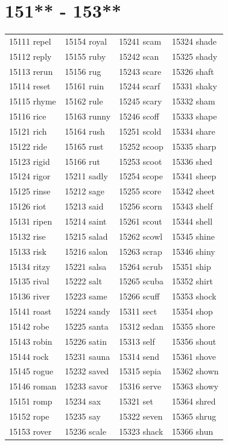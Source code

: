 \documentclass[10pt, oneside]{book}
\begin{document}
\begin{table}
	\centering
	\section*{151** - 153**}
	\begin{tabular}{l l l l}
15111 repel &15154 royal &15241 scam &15324 shade\\
15112 reply &15155 ruby &15242 scan &15325 shady\\
15113 rerun &15156 rug &15243 scare &15326 shaft\\
15114 reset &15161 ruin &15244 scarf &15331 shaky\\
15115 rhyme &15162 rule &15245 scary &15332 sham\\
15116 rice &15163 runny &15246 scoff &15333 shape\\
15121 rich &15164 rush &15251 scold &15334 share\\
15122 ride &15165 rust &15252 scoop &15335 sharp\\
15123 rigid &15166 rut &15253 scoot &15336 shed\\
15124 rigor &15211 sadly &15254 scope &15341 sheep\\
15125 rinse &15212 sage &15255 score &15342 sheet\\
15126 riot &15213 said &15256 scorn &15343 shelf\\
15131 ripen &15214 saint &15261 scout &15344 shell\\
15132 rise &15215 salad &15262 scowl &15345 shine\\
15133 risk &15216 salon &15263 scrap &15346 shiny\\
15134 ritzy &15221 salsa &15264 scrub &15351 ship\\
15135 rival &15222 salt &15265 scuba &15352 shirt\\
15136 river &15223 same &15266 scuff &15353 shock\\
15141 roast &15224 sandy &15311 sect &15354 shop\\
15142 robe &15225 santa &15312 sedan &15355 shore\\
15143 robin &15226 satin &15313 self &15356 shout\\
15144 rock &15231 sauna &15314 send &15361 shove\\
15145 rogue &15232 saved &15315 sepia &15362 shown\\
15146 roman &15233 savor &15316 serve &15363 showy\\
15151 romp &15234 sax &15321 set &15364 shred\\
15152 rope &15235 say &15322 seven &15365 shrug\\
15153 rover &15236 scale &15323 shack &15366 shun\\
	\end{tabular}
 \end{table}
\clearpage
\end{document}
